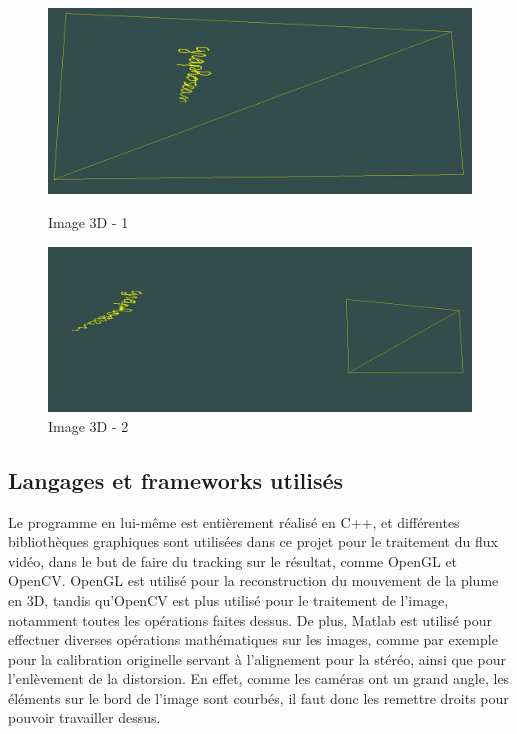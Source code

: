 \begin{figure}
\includegraphics[width=\textwidth]{Modules/Picture/3d_1}
\caption{Image 3D - 1}
\label{3D1}
\vspace{30px}
\includegraphics[width=\textwidth]{Modules/Picture/3d_2}
\caption{Image 3D - 2}
\label{3D2}
\end{figure}

\clearpage



\subsection{Langages et frameworks utilisés}

Le programme en lui-même est entièrement réalisé en C++, et différentes bibliothèques graphiques sont utilisées dans ce projet pour le traitement du flux vidéo, dans le but de faire du tracking sur le résultat, comme OpenGL et OpenCV. OpenGL est utilisé pour la reconstruction du mouvement de la plume en 3D, tandis qu'OpenCV est plus utilisé pour le traitement de l'image, notamment toutes les opérations faites dessus. De plus, Matlab est utilisé pour effectuer diverses opérations mathématiques sur les images, comme par exemple pour la calibration originelle servant à l'alignement pour la stéréo, ainsi que pour l'enlèvement de la distorsion. En effet, comme les caméras ont un grand angle, les éléments sur le bord de l'image sont courbés, il faut donc les remettre droits pour pouvoir travailler dessus.

